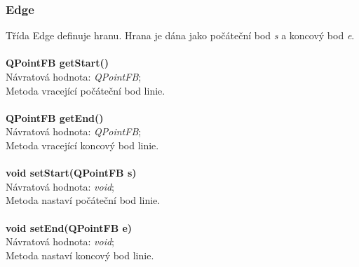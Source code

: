 \documentclass[a4paper, 12pt]{article}
\begin{document}
\subsubsection{Edge}
Třída Edge definuje hranu. Hrana je dána jako počáteční bod \textit{s} a koncový bod \textit{e}.\\
\\
\textbf{QPointFB getStart()}\\
Návratová hodnota: \textit{QPointFB};\\
Metoda vracející počáteční bod linie.\\
\\
\textbf{QPointFB getEnd()}\\
Návratová hodnota: \textit{QPointFB};\\
Metoda vracející koncový bod linie.\\
\\
\textbf{void setStart(QPointFB s)}\\
Návratová hodnota: \textit{void};\\
Metoda nastaví počáteční bod linie.\\
\\
\textbf{void setEnd(QPointFB e)}\\
Návratová hodnota: \textit{void};\\
Metoda nastaví koncový bod linie.
\end{document}
